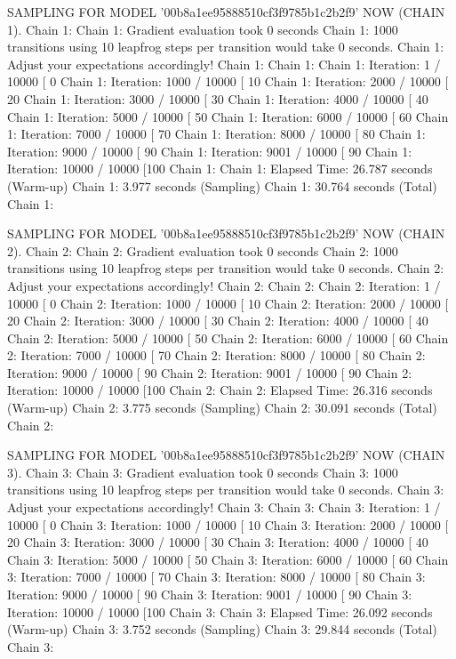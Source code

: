\documentclass[
]{jss}
\begin{document}
\begin{CodeChunk}
\begin{CodeOutput}
SAMPLING FOR MODEL '00b8a1ee95888510cf3f9785b1c2b2f9' NOW (CHAIN 1).
Chain 1: 
Chain 1: Gradient evaluation took 0 seconds
Chain 1: 1000 transitions using 10 leapfrog steps per transition would take 0 seconds.
Chain 1: Adjust your expectations accordingly!
Chain 1: 
Chain 1: 
Chain 1: Iteration:    1 / 10000 [  0%
Chain 1: Iteration: 1000 / 10000 [ 10%
Chain 1: Iteration: 2000 / 10000 [ 20%
Chain 1: Iteration: 3000 / 10000 [ 30%
Chain 1: Iteration: 4000 / 10000 [ 40%
Chain 1: Iteration: 5000 / 10000 [ 50%
Chain 1: Iteration: 6000 / 10000 [ 60%
Chain 1: Iteration: 7000 / 10000 [ 70%
Chain 1: Iteration: 8000 / 10000 [ 80%
Chain 1: Iteration: 9000 / 10000 [ 90%
Chain 1: Iteration: 9001 / 10000 [ 90%
Chain 1: Iteration: 10000 / 10000 [100%
Chain 1: 
Chain 1:  Elapsed Time: 26.787 seconds (Warm-up)
Chain 1:                3.977 seconds (Sampling)
Chain 1:                30.764 seconds (Total)
Chain 1: 

SAMPLING FOR MODEL '00b8a1ee95888510cf3f9785b1c2b2f9' NOW (CHAIN 2).
Chain 2: 
Chain 2: Gradient evaluation took 0 seconds
Chain 2: 1000 transitions using 10 leapfrog steps per transition would take 0 seconds.
Chain 2: Adjust your expectations accordingly!
Chain 2: 
Chain 2: 
Chain 2: Iteration:    1 / 10000 [  0%
Chain 2: Iteration: 1000 / 10000 [ 10%
Chain 2: Iteration: 2000 / 10000 [ 20%
Chain 2: Iteration: 3000 / 10000 [ 30%
Chain 2: Iteration: 4000 / 10000 [ 40%
Chain 2: Iteration: 5000 / 10000 [ 50%
Chain 2: Iteration: 6000 / 10000 [ 60%
Chain 2: Iteration: 7000 / 10000 [ 70%
Chain 2: Iteration: 8000 / 10000 [ 80%
Chain 2: Iteration: 9000 / 10000 [ 90%
Chain 2: Iteration: 9001 / 10000 [ 90%
Chain 2: Iteration: 10000 / 10000 [100%
Chain 2: 
Chain 2:  Elapsed Time: 26.316 seconds (Warm-up)
Chain 2:                3.775 seconds (Sampling)
Chain 2:                30.091 seconds (Total)
Chain 2: 

SAMPLING FOR MODEL '00b8a1ee95888510cf3f9785b1c2b2f9' NOW (CHAIN 3).
Chain 3: 
Chain 3: Gradient evaluation took 0 seconds
Chain 3: 1000 transitions using 10 leapfrog steps per transition would take 0 seconds.
Chain 3: Adjust your expectations accordingly!
Chain 3: 
Chain 3: 
Chain 3: Iteration:    1 / 10000 [  0%
Chain 3: Iteration: 1000 / 10000 [ 10%
Chain 3: Iteration: 2000 / 10000 [ 20%
Chain 3: Iteration: 3000 / 10000 [ 30%
Chain 3: Iteration: 4000 / 10000 [ 40%
Chain 3: Iteration: 5000 / 10000 [ 50%
Chain 3: Iteration: 6000 / 10000 [ 60%
Chain 3: Iteration: 7000 / 10000 [ 70%
Chain 3: Iteration: 8000 / 10000 [ 80%
Chain 3: Iteration: 9000 / 10000 [ 90%
Chain 3: Iteration: 9001 / 10000 [ 90%
Chain 3: Iteration: 10000 / 10000 [100%
Chain 3: 
Chain 3:  Elapsed Time: 26.092 seconds (Warm-up)
Chain 3:                3.752 seconds (Sampling)
Chain 3:                29.844 seconds (Total)
Chain 3: 


\end{CodeOutput}
\end{CodeChunk}
\end{document}
